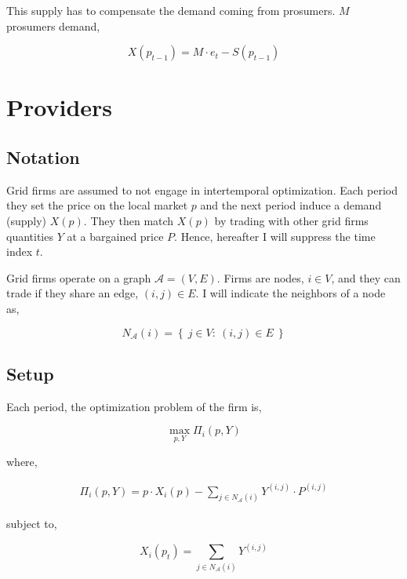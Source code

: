 \documentclass[american]{scrartcl}
\newcommand{\set}[1]{\left\{#1\right\}}
\begin{document}
This supply has to compensate the demand coming from prosumers. $M$ prosumers demand,

\begin{equation}
	X(p_{t-1}) = M \cdot e_t - S(p_{t-1})
\end{equation}

\section{Providers}

\subsection{Notation}

Grid firms are assumed to not engage in intertemporal optimization. Each period they set the price on the local market $p$ and the next period induce a demand (supply) $X(p)$. They then match $X(p)$ by trading with other grid firms quantities $Y$ at a bargained price $P$. Hence, hereafter I will suppress the time index $t$.

Grid firms operate on a graph $\mathcal{A} = (V, E)$. Firms are nodes, $i \in V$, and they can trade if they share an edge, $(i, j) \in E$. I will indicate the neighbors of a node as,

\begin{equation}
	N_{\mathcal{A}}(i) = \set{ \ j \in V: \ (i, j) \in E \ }
\end{equation}

\subsection{Setup}

Each period, the optimization problem of the firm is,

\begin{equation}
	\max_{p, Y} \Pi_i(p, Y)
\end{equation}

where,

\begin{equation}
	\begin{split}
		\Pi_i(p, Y) = p \cdot X_i(p) - \sum_{j \in N_{\mathcal{A}}(i)} Y^{(i, j)} \cdot P^{(i, j)}
	\end{split}
\end{equation}

subject to,

\begin{equation}
	X_i(p_t) =  \sum_{j \in N_{\mathcal{A}}(i)} Y^{(i, j)}
\end{equation}
\end{document}
